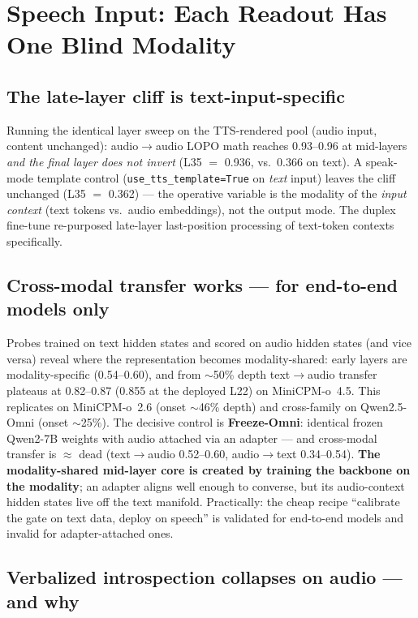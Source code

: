 \section{Speech Input: Each Readout Has One Blind Modality}
\label{sec:speech}

\subsection{The late-layer cliff is text-input-specific}

Running the identical layer sweep on the TTS-rendered pool (audio input,
content unchanged): audio$\rightarrow$audio LOPO math reaches 0.93--0.96 at
mid-layers \emph{and the final layer does not invert} (L35 $=$ 0.936, vs.\
0.366 on text). A speak-mode template control
(\texttt{use\_tts\_template=True} on \emph{text} input) leaves the cliff
unchanged (L35 $=$ 0.362) --- the operative variable is the modality of the
\emph{input context} (text tokens vs.\ audio embeddings), not the output
mode. The duplex fine-tune re-purposed late-layer last-position processing
of text-token contexts specifically.

\subsection{Cross-modal transfer works --- for end-to-end models only}
\label{sec:xmodal}

Probes trained on text hidden states and scored on audio hidden states (and
vice versa) reveal where the representation becomes modality-shared: early
layers are modality-specific (0.54--0.60), and from $\sim$50\% depth
text$\rightarrow$audio transfer plateaus at 0.82--0.87 (0.855 at the
deployed L22) on MiniCPM-o~4.5. This replicates on MiniCPM-o~2.6 (onset
$\sim$46\% depth) and cross-family on Qwen2.5-Omni (onset $\sim$25\%). The
decisive control is \textbf{Freeze-Omni}: identical frozen Qwen2-7B weights
with audio attached via an adapter --- and cross-modal transfer is
$\approx$ dead (text$\rightarrow$audio 0.52--0.60, audio$\rightarrow$text
0.34--0.54). \textbf{The modality-shared mid-layer core is created by
training the backbone on the modality}; an adapter aligns well enough to
converse, but its audio-context hidden states live off the text manifold.
Practically: the cheap recipe ``calibrate the gate on text data, deploy on
speech'' is validated for end-to-end models and invalid for
adapter-attached ones.

\subsection{Verbalized introspection collapses on audio --- and why}
\label{sec:audioptrue}


